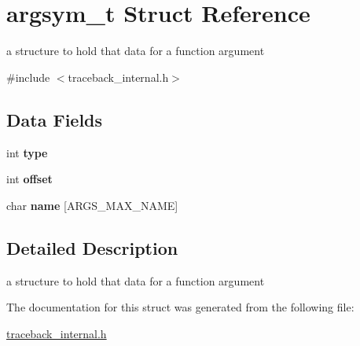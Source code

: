 \hypertarget{structargsym__t}{\section{argsym\-\_\-t Struct Reference}
\label{structargsym__t}
}


a structure to hold that data for a function argument  




{\ttfamily \#include $<$traceback\-\_\-internal.\-h$>$}

\subsection*{Data Fields}
\begin{DoxyCompactItemize}
\item 
\hypertarget{structargsym__t_acdf9e6d5d672fa74cd555256818c063c}{int {\bfseries type}}\label{structargsym__t_acdf9e6d5d672fa74cd555256818c063c}

\item 
\hypertarget{structargsym__t_ad0a52133de71838a164102ac2ec4088e}{int {\bfseries offset}}\label{structargsym__t_ad0a52133de71838a164102ac2ec4088e}

\item 
\hypertarget{structargsym__t_a85ff80eacc4cbdd038f431fd9f105765}{char {\bfseries name} \mbox{[}A\-R\-G\-S\-\_\-\-M\-A\-X\-\_\-\-N\-A\-M\-E\mbox{]}}\label{structargsym__t_a85ff80eacc4cbdd038f431fd9f105765}

\end{DoxyCompactItemize}


\subsection{Detailed Description}
a structure to hold that data for a function argument 

The documentation for this struct was generated from the following file\-:\begin{DoxyCompactItemize}
\item 
\hyperlink{traceback__internal_8h}{traceback\-\_\-internal.\-h}\end{DoxyCompactItemize}
